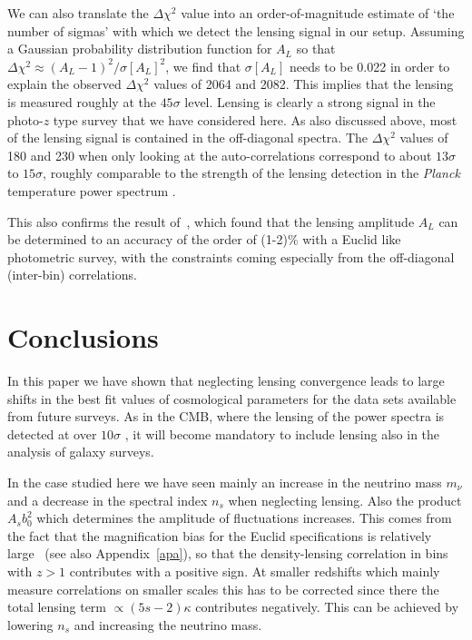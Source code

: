 We can also translate the $\Delta\chi^2$ value into an order-of-magnitude estimate of `the number of sigmas' with which we detect the lensing signal in our setup. Assuming a Gaussian probability distribution function for $A_L$ so that $\Delta\chi^2 \approx (A_L-1)^2/\sigma[A_L]^2$, we find that $\sigma[A_L]$ needs to be 0.022 in order to explain the observed $\Delta\chi^2$ values of 2064 and 2082. This implies that the lensing is measured roughly at the $45\sigma$  level. Lensing is clearly a strong signal in the photo-$z$ type survey that we have considered here. As also discussed above, most of the lensing signal is contained in the off-diagonal spectra. The $\Delta\chi^2$ values of 180 and 230 when only looking at the auto-correlations correspond to about $13\sigma$ to $15\sigma$, roughly comparable to the strength of the lensing detection in the {\it Planck} temperature power spectrum \cite{Ade:2015xua}.


This also confirms the result of~\cite{Montanari:2015rga}, which found that the lensing amplitude $A_L$ can be determined to an accuracy of the order of (1-2)\%  with a Euclid like photometric survey, with the constraints coming especially from the off-diagonal (inter-bin) correlations.


\section{Conclusions}
\label{chapter-mnu:conclusions}

In this paper we have shown that neglecting  lensing convergence leads to large shifts in the best fit values of cosmological parameters for the data sets
available from future surveys. As in the CMB, where the lensing of the power spectra is detected at over $10\sigma$ \cite{Ade:2015xua},
it will become mandatory to include lensing also in the analysis of galaxy surveys.

In the case studied here we have seen mainly an increase in the neutrino mass $m_\nu$ and a decrease in the spectral index $n_s$ when neglecting lensing. Also the product $A_sb_0^2$ which determines the amplitude of fluctuations increases. This comes from the fact that the magnification bias for the Euclid specifications is relatively large~\cite{Montanari:2015rga} (see also Appendix~\ref{apa}), so that the  density-lensing correlation in bins with $z>1$ contributes with a positive sign. At smaller redshifts which mainly measure correlations on smaller scales this has to be corrected since there the total lensing term $\propto (5s-2)\kappa$ contributes negatively. This can be achieved by lowering $n_s$ and increasing the neutrino mass.

